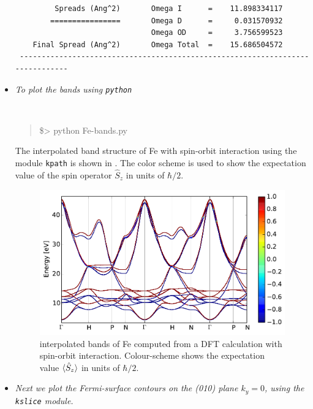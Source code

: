 \begin{itemize}
\begin{tcolorbox}[sharp corners,boxrule=0.5pt]
{\begin{verbatim}
         Spreads (Ang^2)       Omega I      =    11.898334117
        ================       Omega D      =     0.031570932
                               Omega OD     =     3.756599523
    Final Spread (Ang^2)       Omega Total  =    15.686504572
 ------------------------------------------------------------------------------
	\end{verbatim}
	}
	\end{tcolorbox}
	\item[] {\it To plot the bands using {\tt python}}
	{\tt
	\begin{quote}
	\$> python Fe-bands.py
	\end{quote}
	}
	The interpolated band structure of Fe with spin-orbit interaction using the module {\tt kpath} is shown in . The color scheme is used to show the expectation value of the spin operator $\hat{S}_z$ in units of $\hbar/2$.
	\begin{figure}[h!]
	\centering
	\includegraphics[width=0.6\columnwidth]{figure/example17/Fe_bandstructure.pdf}
	\caption{\Wannier{} interpolated bands of Fe computed from a DFT calculation with spin-orbit interaction. Colour-scheme shows the expectation value $\braket{\hat{S}_z}$ in units of $\hbar/2$.}\label{fig17.1}
	\end{figure}
	\item[]{\it Next we plot the Fermi-surface contours on the (010) plane $k_y = 0$, using the {\tt kslice} module.}


\end{itemize}
